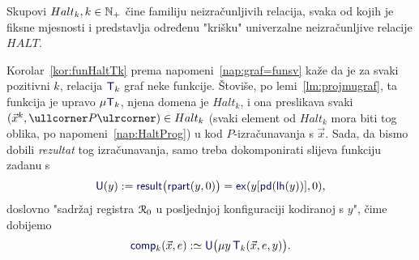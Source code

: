 Skupovi $Halt_k,k\in{\mathbb N}_+$ čine familiju neizračunljivih relacija, svaka od kojih je fiksne mjesnosti i predstavlja određenu "krišku" univerzalne neizračunljive relacije $HALT$.


Korolar~\ref{kor:funHaltTk} prema napomeni~\ref{nap:graf=funsv} kaže da je za svaki pozitivni $k$, relacija $\f T_k$ graf neke funkcije. Štoviše, po lemi~\ref{lm:projmugraf}, ta funkcija je upravo $\mu\f T_k$, njena domena je $Halt_k$, i ona preslikava svaki $(\vec x^k,\kprog{P})\in Halt_k$ (svaki element od $Halt_k$ mora biti tog oblika, po napomeni~\ref{nap:HaltProg}) u kod $P$-izračunavanja s $\vec x$. Sada, da bismo dobili \emph{rezultat} tog izračunavanja, samo treba dokomponirati slijeva funkciju zadanu s
\begin{equation}\label{eq:Udef}
    \f U(y):=\f{result}\bigl(\f{rpart}(y,0)\bigr)=\f{ex}(y[\f{pd}(\f{lh}(y))],0)\text,
\end{equation}
doslovno "sadržaj registra $\mathcal R_{0}$ u posljednjoj konfiguraciji kodiranoj s $y$", čime dobijemo
\begin{equation}
    \f{comp}_k(\vec x,e):\simeq \f U\bigl(\mu y\,\f T_k(\vec x,e,y)\bigr)\text.
\end{equation}

